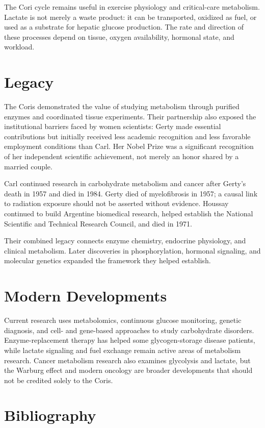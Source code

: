 The Cori cycle remains useful in exercise physiology and critical-care metabolism. Lactate is not merely a waste product: it can be transported, oxidized as fuel, or used as a substrate for hepatic glucose production. The rate and direction of these processes depend on tissue, oxygen availability, hormonal state, and workload.

\section{Legacy}

The Coris demonstrated the value of studying metabolism through purified enzymes and coordinated tissue experiments. Their partnership also exposed the institutional barriers faced by women scientists: Gerty made essential contributions but initially received less academic recognition and less favorable employment conditions than Carl. Her Nobel Prize was a significant recognition of her independent scientific achievement, not merely an honor shared by a married couple.

Carl continued research in carbohydrate metabolism and cancer after Gerty's death in 1957 and died in 1984. Gerty died of myelofibrosis in 1957; a causal link to radiation exposure should not be asserted without evidence. Houssay continued to build Argentine biomedical research, helped establish the National Scientific and Technical Research Council, and died in 1971.

Their combined legacy connects enzyme chemistry, endocrine physiology, and clinical metabolism. Later discoveries in phosphorylation, hormonal signaling, and molecular genetics expanded the framework they helped establish.

\section{Modern Developments}

Current research uses metabolomics, continuous glucose monitoring, genetic diagnosis, and cell- and gene-based approaches to study carbohydrate disorders. Enzyme-replacement therapy has helped some glycogen-storage disease patients, while lactate signaling and fuel exchange remain active areas of metabolism research. Cancer metabolism research also examines glycolysis and lactate, but the Warburg effect and modern oncology are broader developments that should not be credited solely to the Coris.

\section{Bibliography}

